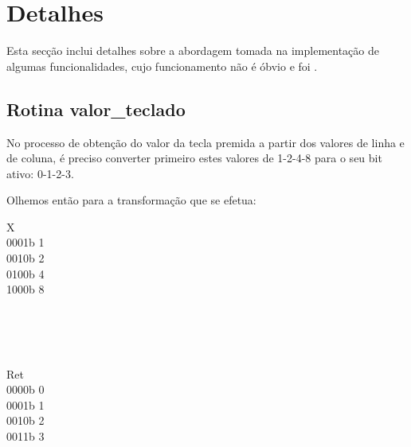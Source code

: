 \documentclass{article}
\begin{document}
\newpage



\tableofcontents
\newpage


\section{Detalhes}
Esta secção inclui detalhes sobre a abordagem tomada na implementação de algumas funcionalidades, cujo funcionamento não é óbvio e foi .

\subsection{Rotina valor\_teclado}
No processo de obtenção do valor da tecla premida a partir dos valores de linha e de coluna, é preciso converter primeiro estes valores de 1-2-4-8 para o seu bit ativo: 0-1-2-3.

\bigbreak

Olhemos então para a transformação que se efetua:

\begin{center}
    \begin{minipage}{1.5cm}
        \begin{center}
            X \\
            0001b 1 \\
            0010b 2 \\
            0100b 4 \\
            1000b 8
        \end{center}
    \end{minipage}
    \begin{minipage}{0.5cm}
        \begin{center}
            \bigbreak
            \textrightarrow \\
            \textrightarrow \\
            \textrightarrow \\
            \textrightarrow
        \end{center}
    \end{minipage}
    \begin{minipage}{1.5cm}
        \begin{center}
            Ret \\
            0000b 0 \\
            0001b 1 \\
            0010b 2 \\
            0011b 3
        \end{center}
    \end{minipage}
\end{center}
\end{document}
